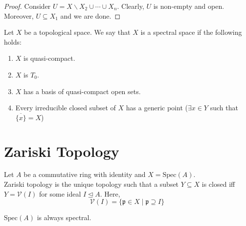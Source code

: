 \documentclass[oneside, 12pt, ]{scrbook}
\newcommand{\V}{\mathcal{V}}
\newcommand{\spec}{\mathrm{Spec}}
\newcommand{\pr}{\mathfrak{p}}
\theoremstyle{theorem}
\begin{document}
\begin{proof}
Consider $U = X \backslash X_{2} \cup \cdots \cup X_{n}$. Clearly, $U$ is non-empty and open. Moreover, $U \subseteq X_{1}$ and we are done. 
\end{proof}

\begin{definition}
Let $X$ be a topological space. We say that $X$ is a spectral space if the following holds: 
\begin{enumerate}
\item $X$ is quasi-compact.
\item $X$ is $T_{0}$.
\item $X$ has a basis of quasi-compact open sets.
\item Every irreducible closed subset of $X$ has a generic point ($\exists x \in Y$ such that $\overline{\{x\}}  = X$)
\end{enumerate}
\end{definition}

\section{Zariski Topology}
Let $A$ be a commutative ring with identity and $X = \spec(A)$. \\

Zariski topology is the unique topology such that a subset $Y\subseteq X$ is closed iff $Y = \V (I)$ for some ideal $I \unlhd A$. Here, $$\V(I) = \{\pr \in X \mid \pr \supseteq I\}$$

\begin{theorem}
$\spec(A)$ is always spectral.
\end{theorem}
\end{document}
